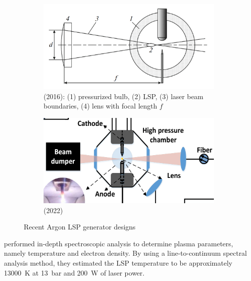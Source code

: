             \begin{figure}[h]
                \centering
                \begin{subfigure}[t]{0.47\textwidth}
                    \centering
                    \includegraphics[width=\textwidth]{assets/2 background/zimakov.png}
                    \caption{\textcite{zimakovInteractionNearIRLaser2016} (2016): (1) pressurized bulb, (2) LSP, (3) laser beam boundaries, (4) lens with focal length $f$}
                    \label{fig:recentLSPsystems_zimakov}
                \end{subfigure}
                \hfill
                \begin{subfigure}[t]{0.47\textwidth}
                    \centering
                    \includegraphics[width=\textwidth]{assets/2 background/LuYuanSongetal.png}
                    \caption{\textcite{luCharacteristicDiagnosticsLaserStabilized2022} (2022)}
                    \label{fig:recentLSPsystems_lu}
                \end{subfigure}
                \caption{Recent Argon LSP generator designs}
                \label{fig:recentLSPsystems}
            \end{figure}

            \textcite{luCharacteristicDiagnosticsLaserStabilized2022} performed in-depth spectroscopic analysis to determine plasma parameters, namely temperature and electron density. By using a line-to-continuum spectral analysis method, they estimated the LSP temperature to be approximately \qty{13000}{K} at \qty{13}{bar} and \qty{200}{W} of laser power.

